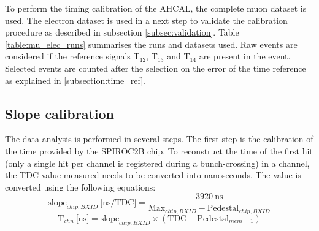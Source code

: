 \documentclass[twoside,a4paper,11pt]{article}
\begin{document}
To perform the timing calibration of the AHCAL, the complete muon dataset is used. The electron dataset is used in a next step to validate the calibration procedure as described in subsection \ref{subsec:validation}. Table \ref{table:mu_elec_runs} summarises the runs and datasets used. Raw events are considered if the reference signals T$_{12}$,  T$_{13}$ and T$_{14}$ are present in the event. Selected events are counted after the selection on the error of the time reference as explained in \ref{subsection:time_ref}. 
\begin{table}[htbp]
\centering
{}
  \caption{Table with the statistic before and after selection used for timing calibration.}
  \label{table:mu_elec_runs}
\end{table}

\subsection{Slope calibration}
\label{subsec:slope_calib}

The data analysis is performed in several steps. The first step is the calibration of the time provided by the SPIROC2B chip. To reconstruct the time of the first hit (only a single hit per channel is registered during a bunch-crossing) in a channel, the TDC value measured needs to be converted into nanoseconds. The value is converted using the following equations:
\begin{equation} \label{eq:slope}
\text{slope}_{chip, BXID} \: \text{[ns/TDC]} = \frac{3920 \: \text{ns}}{\text{Max}_{chip, BXID} - \text{Pedestal}_{chip, BXID}}
\end{equation}
\begin{equation} \label{eq:time_chn}
\text{T}_{chn} \: \text{[ns]} = \text{slope}_{chip, BXID} \times (\text{TDC} - \text{Pedestal}_{mem=1} )
\end{equation}
\end{document}
